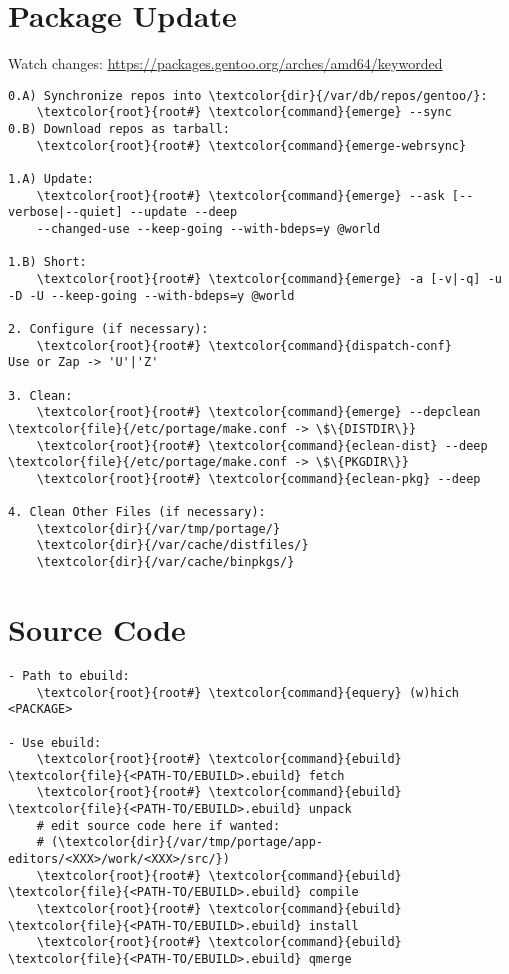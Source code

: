 \documentclass[10pt, a4paper, onecolumn, openany]{book}         %
\begin{document}
\section{Package Update}
\label{package-update}
Watch changes: \underline{\url{https://packages.gentoo.org/arches/amd64/keyworded}}
\begin{Verbatim}[commandchars=\\\{\}]
0.A) Synchronize repos into \textcolor{dir}{/var/db/repos/gentoo/}:
    \textcolor{root}{root#} \textcolor{command}{emerge} --sync
0.B) Download repos as tarball:
    \textcolor{root}{root#} \textcolor{command}{emerge-webrsync}

1.A) Update:
    \textcolor{root}{root#} \textcolor{command}{emerge} --ask [--verbose|--quiet] --update --deep
    --changed-use --keep-going --with-bdeps=y @world

1.B) Short:
    \textcolor{root}{root#} \textcolor{command}{emerge} -a [-v|-q] -u -D -U --keep-going --with-bdeps=y @world

2. Configure (if necessary):
    \textcolor{root}{root#} \textcolor{command}{dispatch-conf}
Use or Zap -> 'U'|'Z'

3. Clean:
    \textcolor{root}{root#} \textcolor{command}{emerge} --depclean
\textcolor{file}{/etc/portage/make.conf -> \$\{DISTDIR\}}
    \textcolor{root}{root#} \textcolor{command}{eclean-dist} --deep
\textcolor{file}{/etc/portage/make.conf -> \$\{PKGDIR\}}
    \textcolor{root}{root#} \textcolor{command}{eclean-pkg} --deep

4. Clean Other Files (if necessary):
    \textcolor{dir}{/var/tmp/portage/}
    \textcolor{dir}{/var/cache/distfiles/}
    \textcolor{dir}{/var/cache/binpkgs/}
\end{Verbatim}

\section{Source Code}
\begin{Verbatim}[commandchars=\\\{\}]
- Path to ebuild:
    \textcolor{root}{root#} \textcolor{command}{equery} (w)hich <PACKAGE>
    
- Use ebuild:
    \textcolor{root}{root#} \textcolor{command}{ebuild} \textcolor{file}{<PATH-TO/EBUILD>.ebuild} fetch
    \textcolor{root}{root#} \textcolor{command}{ebuild} \textcolor{file}{<PATH-TO/EBUILD>.ebuild} unpack
    # edit source code here if wanted:
    # (\textcolor{dir}{/var/tmp/portage/app-editors/<XXX>/work/<XXX>/src/})
    \textcolor{root}{root#} \textcolor{command}{ebuild} \textcolor{file}{<PATH-TO/EBUILD>.ebuild} compile
    \textcolor{root}{root#} \textcolor{command}{ebuild} \textcolor{file}{<PATH-TO/EBUILD>.ebuild} install
    \textcolor{root}{root#} \textcolor{command}{ebuild} \textcolor{file}{<PATH-TO/EBUILD>.ebuild} qmerge
\end{Verbatim}
\end{document}
